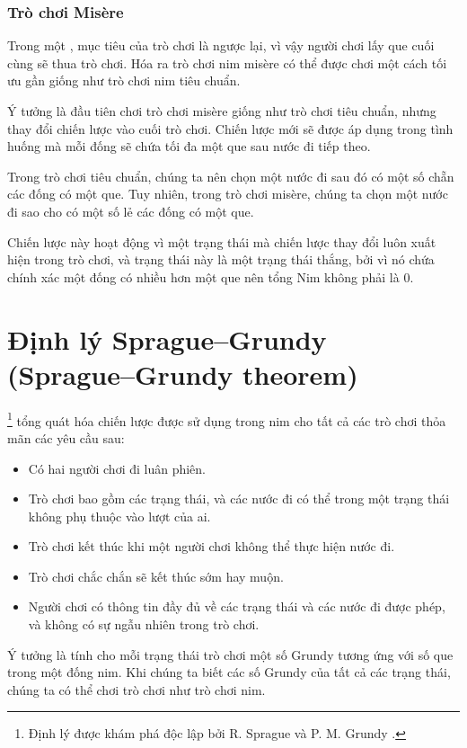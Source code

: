 \subsubsection{Trò chơi Misère}


Trong một , mục tiêu của trò chơi
là ngược lại,
vì vậy người chơi lấy que cuối cùng
sẽ thua trò chơi.
Hóa ra trò chơi nim misère có thể được
chơi một cách tối ưu gần giống như trò chơi nim tiêu chuẩn.

Ý tưởng là đầu tiên chơi trò chơi misère
giống như trò chơi tiêu chuẩn, nhưng thay đổi chiến lược
vào cuối trò chơi.
Chiến lược mới sẽ được áp dụng trong tình huống
mà mỗi đống sẽ chứa tối đa một que
sau nước đi tiếp theo.

Trong trò chơi tiêu chuẩn, chúng ta nên chọn một nước đi
sau đó có một số chẵn các đống có một que.
Tuy nhiên, trong trò chơi misère, chúng ta chọn một nước đi sao cho
có một số lẻ các đống có một que.

Chiến lược này hoạt động vì một trạng thái mà
chiến lược thay đổi luôn xuất hiện trong trò chơi,
và trạng thái này là một trạng thái thắng, bởi vì
nó chứa chính xác một đống có nhiều hơn một que
nên tổng Nim không phải là 0.

\section{Định lý Sprague–Grundy (Sprague–Grundy theorem)}


\footnote{Định lý được
khám phá độc lập bởi R. Sprague \cite{spr35} và P. M. Grundy \cite{gru39}.} tổng quát hóa
chiến lược được sử dụng trong nim cho tất cả các trò chơi thỏa mãn
các yêu cầu sau:

\begin{itemize}[noitemsep]
\item Có hai người chơi đi luân phiên.
\item Trò chơi bao gồm các trạng thái, và các nước đi có thể
trong một trạng thái không phụ thuộc vào lượt của ai.
\item Trò chơi kết thúc khi một người chơi không thể thực hiện nước đi.
\item Trò chơi chắc chắn sẽ kết thúc sớm hay muộn.
\item Người chơi có thông tin đầy đủ về
các trạng thái và các nước đi được phép, và không có sự ngẫu nhiên trong trò chơi.
\end{itemize}
Ý tưởng là tính cho mỗi trạng thái trò chơi
một số Grundy tương ứng với số que
trong một đống nim.
Khi chúng ta biết các số Grundy của tất cả các trạng thái,
chúng ta có thể chơi trò chơi như trò chơi nim.

